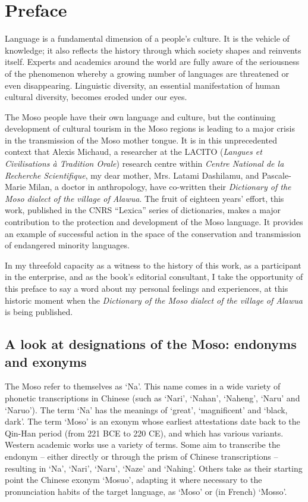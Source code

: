 \langueeng

\chapter*{Preface}

Language is a fundamental dimension of a people's culture. It is the vehicle of knowledge; it also reflects the history through which society shapes and reinvents itself. Experts and academics around the world are fully aware of the seriousness of the phenomenon whereby a growing number of languages are threatened or even disappearing. Linguistic diversity, an essential manifestation of human cultural diversity, becomes eroded under our eyes.

The Moso people have their own language and culture, but the continuing development of cultural tourism in the Moso regions is leading to a major crisis in the transmission of the Moso mother tongue. It is in this unprecedented context that Alexis Michaud, a researcher at the LACITO (\emph{Langues et Civilisations à Tradition Orale}) research centre within \emph{Centre National de la Recherche Scientifique}, my dear mother, Mrs. Latami Dashilamu, and Pascale-Marie Milan, a doctor in anthropology, have co-written their \emph{Dictionary of the Moso dialect of the village of Alawua}. The fruit of eighteen years' effort, this work, published in the CNRS “Lexica” series of dictionaries, makes a major contribution to the protection and development of the Moso language. It provides an example of successful action in the space of the conservation and transmission of endangered minority languages.

In my threefold capacity as a witness to the history of this work, as a participant in the enterprise, and as the book's editorial consultant, I take the opportunity of this preface to say a word about my personal feelings and experiences, at this historic moment when the \emph{Dictionary of the Moso dialect of the village of Alawua} is being published.

\section*{A look at designations of the Moso: endonyms and exonyms}

The Moso refer to themselves as ‘Na’. This name comes in a wide variety of phonetic transcriptions in Chinese (such as ‘Nari’, ‘Nahan’, ‘Naheng’, ‘Naru’ and ‘Naruo’). The term ‘Na’ has the meanings of ‘great’, ‘magnificent’ and ‘black, dark’. The term ‘Moso’ is an exonym whose earliest attestations date back to the Qin-Han period (from 221 BCE to 220 CE), and which has various variants. Western academic works use a variety of terms. Some aim to transcribe the endonym -- either directly or through the prism of Chinese transcriptions -- resulting in ‘Na’, ‘Nari’, ‘Naru’, ‘Naze’ and ‘Nahing’. Others take as their starting point the Chinese exonym  ‘Mosuo’, adapting it where necessary to the pronunciation habits of the target language, as ‘Moso’ or (in French) ‘Mosso’.

